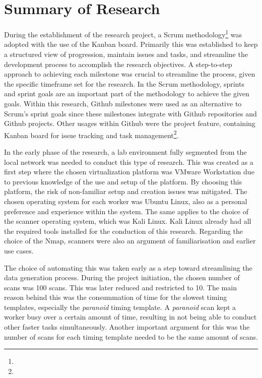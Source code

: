 
\section{Summary of Research}
During the establishment of the research project, a Scrum methodology\footnote{} was adopted with the use of the Kanban board. Primarily this was established to keep a structured view of progression, maintain issues and tasks, and streamline the development process to accomplish the research objectives. A step-to-step approach to achieving each milestone was crucial to streamline the process, given the specific timeframe set for the research.
In the Scrum methodology, sprints and sprint goals are an important part of the methodology to achieve the given goals.
Within this research, Github milestones were used as an alternative to Scrum's sprint goals since these milestones integrate with Github repositories and Github projects.
Other usages within Github were the project feature, containing Kanban board for issue tracking and task management\footnote{}.

In the early phase of the research, a lab environment fully segmented from the local network was needed to conduct this type of research.
This was created as a first step where the chosen virtualization platform was VMware Workstation due to previous knowledge of the use and setup of the platform.
By choosing this platform, the risk of non-familiar setup and creation issues was mitigated.
The chosen operating system for each worker was Ubuntu Linux, also as a personal preference and experience within the system. The same applies to the choice of the scanner operating system, which was Kali Linux. Kali Linux already had all the required tools installed for the conduction of this research.
Regarding the choice of the Nmap, scanners were also an argument of familiarisation and earlier use cases.

The choice of automating this was taken early as a step toward streamlining the data generation process.
During the project initiation, the chosen number of scans was 100 scans. This was later reduced and restricted to 10. The main reason behind this was the consummation of time for the slowest timing templates, especially the \textit{paranoid} timing template. A \textit{paranoid} scan kept a worker busy over a certain amount of time, resulting in not being able to conduct other faster tasks simultaneously. Another important argument for this was the number of scans for each timing template needed to be the same amount of scans.

